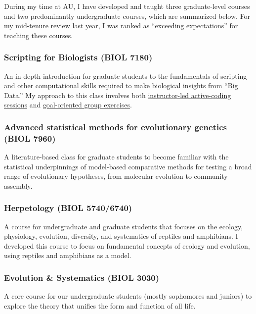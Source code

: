 During my time at AU,
I have developed and taught three graduate-level courses
and two predominantly undergraduate courses,
which are summarized below.
For my mid-tenure review last year, I was ranked as ``exceeding
expectations'' for teaching these courses.

\subsubsection*{Scripting for Biologists (BIOL 7180)}
An in-depth introduction for graduate students to the fundamentals of scripting
and other computational skills required to make biological insights from ``Big
Data.''
My approach to this class involves both
\href{http://phyletica.org/slides/python/intro/}{instructor-led active-coding
    sessions}
and
\href{https://github.com/joaks1/python-translation-project}{goal-oriented group
    exercises}.

\subsubsection*{Advanced statistical methods for evolutionary genetics (BIOL 7960)}
A literature-based class for graduate students to become familiar with the
statistical underpinnings of model-based comparative methods for testing a
broad range of evolutionary hypotheses, from molecular evolution to community
assembly.

\subsubsection*{Herpetology (BIOL 5740/6740)}
A course for undergraduate and graduate students that focuses on the ecology,
physiology, evolution, diversity, and systematics of reptiles and amphibians.
I developed this course to focus on fundamental concepts of ecology and
evolution, using reptiles and amphibians as a model.

\subsubsection*{Evolution \& Systematics (BIOL 3030)}
A core course for our undergraduate students (mostly sophomores and juniors) to
explore the theory that unifies the form and function of all life.

